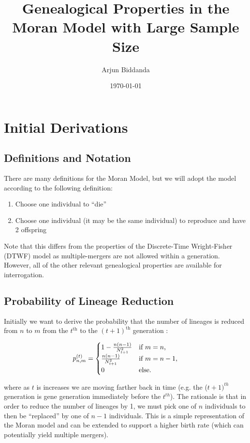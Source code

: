 \documentclass[11pt]{article}
\title{Genealogical Properties in the Moran Model with Large Sample Size}
\author{Arjun Biddanda}
\date{\today}
\begin{document}
\maketitle

\section{Initial Derivations}

\subsection{Definitions and Notation}

There are many definitions for the Moran Model, but we will adopt the model according to the following definition:

\begin{enumerate}
	\item Choose one individual to ``die''
	\item Choose one individual (it may be the same individual) to reproduce and have 2 offspring
\end{enumerate}

Note that this differs from the properties of the Discrete-Time Wright-Fisher (DTWF) model as multiple-mergers are not allowed within a generation. However, all of the other relevant genealogical properties are available for interrogation. 

\subsection{Probability of Lineage Reduction}
Initially we want to derive the probability that the number of lineages is reduced from $n$ to $m$ from the $t^{\text{th}}$ to the $(t+1)^{\text{th}}$ generation :

\begin{equation}
	p^{(t)}_{n,m} = 
	\begin{cases} 1 - \frac{n(n-1)}{N^2_{t+1}}  & \text{if $m = n$,}
		\\
		\frac{n(n-1)}{N^2_{t+1}} &\text{if $ m = n - 1$,}
		\\
		0 &\text{else.}
	\end{cases}
\end{equation}

where as $t$ is increases we are moving farther back in time (e.g. the ($t+1)^{th}$ generation is gene generation immediately before the $t^{th}$). The rationale is that in order to reduce the number of lineages by 1, we must pick one of $n$ individuals to then be ``replaced'' by one of $n-1$ individuals. This is a simple representation of the Moran model and can be extended to support a higher birth rate (which can potentially yield multiple mergers).
\end{document}
